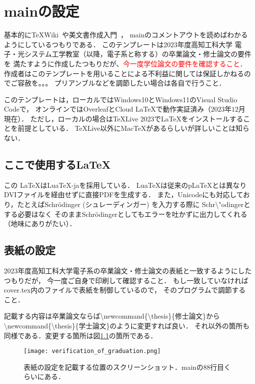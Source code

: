 \chapter{mainの設定}
基本的に\TeX Wiki~\cite{luatex}や美文書作成入門~\cite{美文書作成入門}，
mainのコメントアウトを読めばわかるようにしているつもりである．
このテンプレートは2023年度高知工科大学 電子・光システム工学教室（以降，電子系と称する）の卒業論文・修士論文の要件を
満たすように作成したつもりだが、\textcolor{red}{今一度学位論文の要件を確認すること．}
作成者はこのテンプレートを用いることによる不利益に関しては保証しかねるのでご容赦を。。。
プリアンブルなどを調節したい場合は各自で行うこと．

このテンプレートは，ローカルではWindows10とWindows11のVisual Studio Codeで，
オンラインではOverleafとCloud LaTeXで動作実証済み（$2023$年$12$月現在）．
ただし，ローカルの場合は\TeX Live 2023で\LaTeX をインストールすることを前提としている．
\TeX Live以外にMac\TeX があるらしいが詳しいことは知らない．

\section{ここで使用する\LaTeX}
この \LaTeX はLua\TeX -jaを採用している．
Lua\TeX は従来のp\LaTeX とは異なりDVIファイルを経由せずに直接PDFを生成する．
また，Unicodeにも対応しており，たとえばSchr\"odinger (シュレーディンガー) を入力する際に
Schr\textbackslash "odingerとする必要はなく
そのままSchrödingerとしてもエラーを吐かずに出力してくれる（地味にありがたい）．

\section{表紙の設定}
2023年度高知工科大学電子系の卒業論文・修士論文の表紙と一致するようにしたつもりだが，
今一度ご自身で印刷して確認すること．
もし一致していなければcover.tex内のファイルで表紙を制御しているので，
そのプログラムで調節すること．

記載する内容は卒業論文ならば\textbackslash newcommand\{\textbackslash thesis\}\{修士論文\}から
\textbackslash newcommand\{\textbackslash thesis\}\{学士論文\}のように変更すれば良い．
それ以外の箇所も同様である．変更する箇所は図\ref{fig:cover}の箇所である．

\begin{figure}[h]
  \centering
  \texttt{[image: verification\_of\_graduation.png]}
  \caption{表紙の設定を記載する位置のスクリーンショット．mainの$88$行目くらいにある．}
  \label{fig:cover}
\end{figure}

